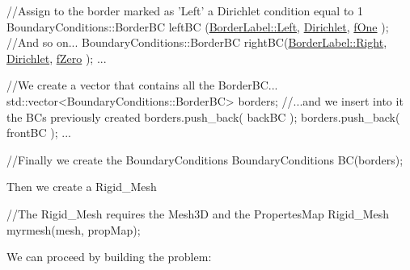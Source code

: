 \begin{DoxyCode}
\textcolor{comment}{//Assign to the border marked as 'Left' a Dirichlet condition equal to 1}
BoundaryConditions::BorderBC leftBC (\hyperlink{namespaceFVCode3D_a604c2047b7f400e68b30a8132178c822a7fd633652b3723bb7716b9db0314a61e}{BorderLabel::Left}, 
      \hyperlink{namespaceFVCode3D_a73660061f11f1671164ce171a053f8c5a192024697bdaa4fbbb39b8961b747bce}{Dirichlet}, \hyperlink{namespaceFVCode3D_a1a9ede09c77441d292a079fbab60fb82}{fOne} );
\textcolor{comment}{//And so on...}
BoundaryConditions::BorderBC rightBC(\hyperlink{namespaceFVCode3D_a604c2047b7f400e68b30a8132178c822a27ec5db52b31c4eba9e240374723f76e}{BorderLabel::Right}, 
      \hyperlink{namespaceFVCode3D_a73660061f11f1671164ce171a053f8c5a192024697bdaa4fbbb39b8961b747bce}{Dirichlet}, \hyperlink{namespaceFVCode3D_a2e72cc81c6f214d6e057af7a02599501}{fZero} );
...

\textcolor{comment}{//We create a vector that contains all the BorderBC...}
std::vector<BoundaryConditions::BorderBC> borders;
\textcolor{comment}{//...and we insert into it the BCs previously created}
borders.push\_back( backBC );
borders.push\_back( frontBC );
...

\textcolor{comment}{//Finally we create the BoundaryConditions}
BoundaryConditions BC(borders);
\end{DoxyCode}


Then we create a Rigid\+\_\+\+Mesh 
\begin{DoxyCode}
\textcolor{comment}{//The Rigid\_Mesh requires the Mesh3D and the PropertesMap}
Rigid\_Mesh myrmesh(mesh, propMap);
\end{DoxyCode}


We can proceed by building the problem\+:



